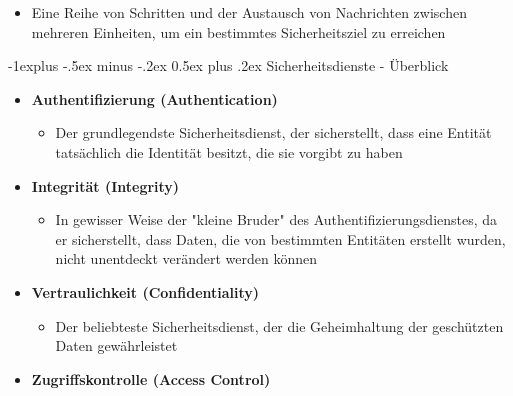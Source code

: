 \documentclass[a4paper]{article}
\makeatletter
\renewcommand{\subsection}{\@startsection{subsection}{2}{0mm}%
 {-1explus -.5ex minus -.2ex}%
 {0.5ex plus .2ex}%
 {\normalfont\normalsize\bfseries}}
\makeatother
\begin{document}
\begin{multicols}{3}
\begin{itemize}
              \begin{itemize}
                  \item
                        Eine Reihe von Schritten und der Austausch von Nachrichten zwischen
                        mehreren Einheiten, um ein bestimmtes Sicherheitsziel zu erreichen
              \end{itemize}
    \end{itemize}


    \subsection{Sicherheitsdienste -
        Überblick}

    \begin{itemize}
        \item
              \textbf{Authentifizierung (Authentication)}

              \begin{itemize}
                  \item
                        Der grundlegendste Sicherheitsdienst, der sicherstellt, dass eine
                        Entität tatsächlich die Identität besitzt, die sie vorgibt zu haben
              \end{itemize}
        \item
              \textbf{Integrität (Integrity)}

              \begin{itemize}
                  \item
                        In gewisser Weise der "kleine Bruder" des
                        Authentifizierungsdienstes, da er sicherstellt, dass Daten, die von
                        bestimmten Entitäten erstellt wurden, nicht unentdeckt verändert
                        werden können
              \end{itemize}
        \item
              \textbf{Vertraulichkeit (Confidentiality)}

              \begin{itemize}
                  \item
                        Der beliebteste Sicherheitsdienst, der die Geheimhaltung der
                        geschützten Daten gewährleistet
              \end{itemize}
        \item
              \textbf{Zugriffskontrolle (Access Control)}


\end{itemize}
\end{multicols}
\end{document}
